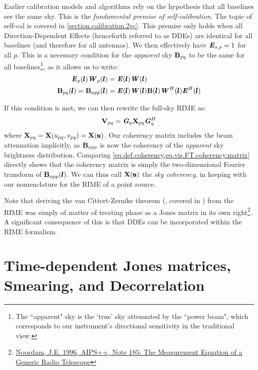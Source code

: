 \pg
Earlier calibration models and algorithms rely on the hypothesis that all baselines see the same sky. This is the \emph{fundamental premise of self-calibration}. The topic of self-cal is covered in \cref{section.calibration.2gc}. This premise only holds when all Direction-Dependent Effects (henceforth referred to as DDEs) are identical for all baselines (and therefore for all antennas). We then effectively have $\textbf{\emph{E}}_{s,p}=1$ for all $p$. This is a necessary condition for the \textit{apparent} sky $\textbf{B}_{pq}$ to be the same for all baselines\footnote{The ``apparent" sky is the `true' sky attenuated by the ``power beam", which corresponds to our instrument's directional sensitivity in the traditional view.}, as it allows us to write:
\begin{align}
\textbf{\emph{E}}_p(\pmb{l}) \textbf{\emph{W}}_p(\pmb{l})&= \textbf{\emph{E}}(\pmb{l}) \textbf{\emph{W}}(\pmb{l})\\
\textbf{B}_{pq}(\pmb{l}) = \textbf{B}_{app}(\pmb{l}) &= \textbf{\emph{E}}(\pmb{l}) \textbf{\emph{W}}(\pmb{l}) \textbf{B} (\pmb{l}) \textbf{\emph{W}}^H(\pmb{l}) \textbf{\emph{E}}^H(\pmb{l})
\end{align}

\pg
If this condition is met, we can then rewrite the full-sky RIME as:
\begin{equation}\label{eq.fullsky.RIME}
\textbf{V}_{pq} = \textbf{\emph{G}}_p \textbf{X}_{pq} \textbf{\emph{G}}_q^H
\end{equation}
where $\textbf{X}_{pq} = \textbf{X}(u_{pq},v_{pq}) = \textbf{X}(\pmb{u})$. Our coherency matrix includes the beam attenuation implicitly, as $\textbf{B}_{app}$ is now the coherency of the \textit{apparent} sky brightness distribution. Comparing \cref{eq.def.coherency,eq.vis.FT.coherency.matrix} directly shows that the coherency matrix is simply the two-dimensional Fourier transform of $\textbf{B}_{app}(\pmb{l})$. We can thus call $\textbf{X}(\pmb{u})$ the \emph{sky coherency}, in keeping with our nomenclature for the RIME of a point source.

\pg
Note that deriving the van Cittert-Zernike theorem (, covered in ) from the RIME was simply of matter of treating phase as a Jones matrix in its own right\footnote{\href{https://raw.githubusercontent.com/wiki/ska-sa/meqtrees/aips++_note185.pdf}{Noordam, J.E. 1996, AIPS++, Note 185: The Measurement Equation of a Generic Radio Telescope}}. A significant consequence of this is that DDEs can be incorporated within the RIME formalism.

\section{Time-dependent Jones matrices, Smearing, and Decorrelation}
\label{section.RIME.TimeDep}

